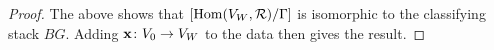 \documentclass{amsart}
\newcommand{\balpha}{\boldsymbol{\alpha}}
\theoremstyle{definition}
\newcommand\VW{V_W}
\begin{document}
\begin{proof}
The above shows that $[\Hom(\VW,\cR)/\Gamma]$ is isomorphic to the classifying stack $BG$.
Adding $\bfx \colon V_0 \rightarrow \VW$ to the data then gives the result.
\end{proof}
\end{document}
